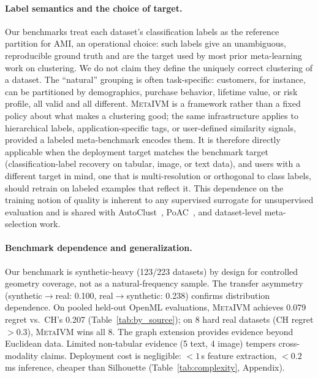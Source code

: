 \documentclass[10pt]{article} %
\newcommand{\ours}{\textsc{MetaIVM}}
\begin{document}
\paragraph{Label semantics and the choice of target.} Our benchmarks treat each dataset's classification labels as the reference partition for AMI, an operational choice: such labels give an unambiguous, reproducible ground truth and are the target used by most prior meta-learning work on clustering. We do not claim they define the uniquely correct clustering of a dataset. The ``natural'' grouping is often task-specific: customers, for instance, can be partitioned by demographics, purchase behavior, lifetime value, or risk profile, all valid and all different. \ours{} is a framework rather than a fixed policy about what makes a clustering good; the same infrastructure applies to hierarchical labels, application-specific tags, or user-defined similarity signals, provided a labeled meta-benchmark encodes them. It is therefore directly applicable when the deployment target matches the benchmark target (classification-label recovery on tabular, image, or text data), and users with a different target in mind, one that is multi-resolution or orthogonal to class labels, should retrain on labeled examples that reflect it. This dependence on the training notion of quality is inherent to any supervised surrogate for unsupervised evaluation and is shared with AutoClust~\citep{poulakis2020autoclust}, PoAC~\citep{dasilva2024poac}, and dataset-level meta-selection work.

\paragraph{Benchmark dependence and generalization.} Our benchmark is synthetic-heavy (123/223 datasets) by design for controlled geometry coverage, not as a natural-frequency sample. The transfer asymmetry (synthetic$\to$real: 0.100, real$\to$synthetic: 0.238) confirms distribution dependence. On pooled held-out OpenML evaluations, \ours{} achieves 0.079 regret vs.\ CH's 0.207 (Table~\ref{tab:by_source}); on 8 hard real datasets (CH regret $> 0.3$), \ours{} wins all 8. The graph extension provides evidence beyond Euclidean data. Limited non-tabular evidence (5 text, 4 image) tempers cross-modality claims. Deployment cost is negligible: $< 1$\,s feature extraction, $< 0.2$\,ms inference, cheaper than Silhouette (Table~\ref{tab:complexity}, Appendix).
\end{document}
